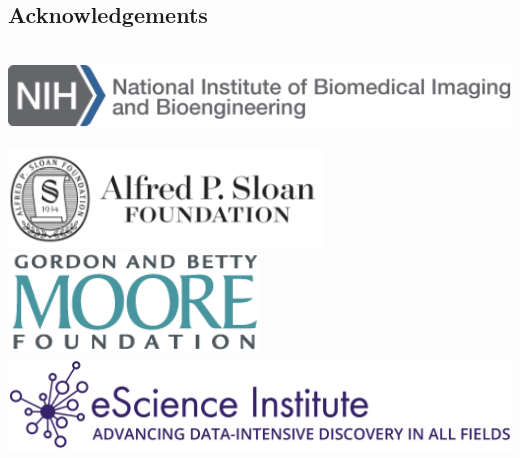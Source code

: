 \documentclass[a0, landscape]{a0poster}
\begin{document}
\begin{multicols}{3}
\nocite{*} %
\footnotesize  %

\subsection*{Acknowledgements} \footnotesize


\includegraphics[height=2.6cm]{NIBIB.png}\\
\includegraphics[height=2.6cm]{SloanLogo.png}
\includegraphics[height=2.6cm]{MooreFdn.png}
\includegraphics[height=2.6cm]{eSciencelogo.png}

\end{multicols}
\end{document}
